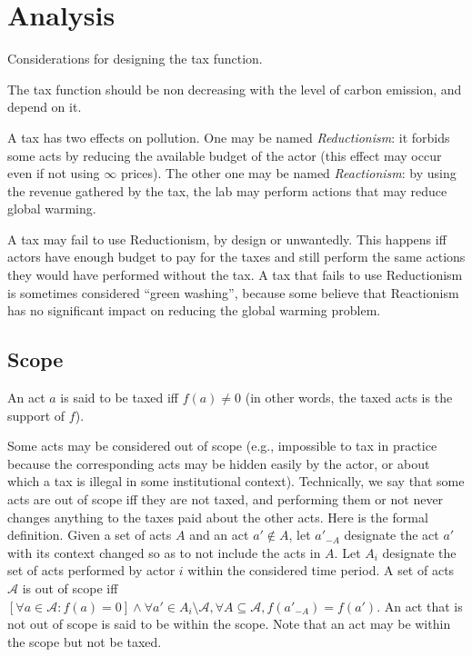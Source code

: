 \documentclass[version=3.21, pagesize, twoside=off, bibliography=totoc, DIV=calc, fontsize=12pt, a4paper, french, english]{scrartcl}
\begin{document}
 \section{Analysis}
\label{sec:analysis}

Considerations for designing the tax function.

The tax function should be non decreasing with the level of carbon emission, and depend on it. 

A tax has two effects on pollution. One may be named \emph{Reductionism}: it forbids some acts by reducing the available budget of the actor (this effect may occur even if not using $\infty$ prices). The other one may be named \emph{Reactionism}: by using the revenue gathered by the tax, the lab may perform actions that may reduce global warming.

A tax may fail to use Reductionism, by design or unwantedly. This happens iff actors have enough budget to pay for the taxes and still perform the same actions they would have performed without the tax. A tax that fails to use Reductionism is sometimes considered “green washing”, because some believe that Reactionism has no significant impact on reducing the global warming problem.

\subsection{Scope}
An act $a$ is said to be taxed iff $f(a) ≠ 0$ (in other words, the taxed acts is the support of $f$).

Some acts may be considered out of scope (e.g., impossible to tax in practice because the corresponding acts may be hidden easily by the actor, or about which a tax is illegal in some institutional context). Technically, we say that some acts are out of scope iff they are not taxed, and performing them or not never changes anything to the taxes paid about the other acts. Here is the formal definition. Given a set of acts $A$ and an act $a' \notin A$, let $a'_{-A}$ designate the act $a'$ with its context changed so as to not include the acts in $A$. Let $A_i$ designate the set of acts performed by actor $i$ within the considered time period. A set of acts $\mathcal{A}$ is out of scope iff $[\forall a \in \mathcal{A}: f(a) = 0] \land \forall a' \in A_i \setminus \mathcal{A}, \forall A \subseteq \mathcal{A}, f(a'_{-A}) = f(a')$.
An act that is not out of scope is said to be within the scope. Note that an act may be within the scope but not be taxed.
\end{document}

